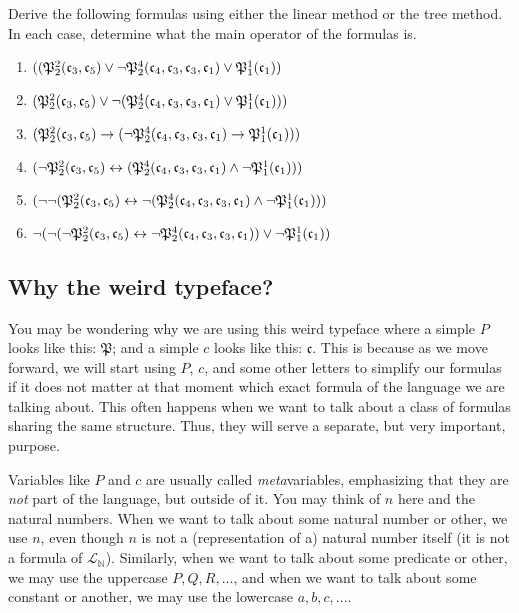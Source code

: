\begin{exc}
Derive the following formulas using either the linear method or the tree method. In each case, determine what the main operator of the formulas is. 

\begin{enumerate}
	\item $((\mathfrak{P}^{2}_{2}(\mathfrak{c}_{3}, \mathfrak{c}_{5})\vee \neg\mathfrak{P}^{4}_{2}(\mathfrak{c}_{4}, \mathfrak{c}_{3}, \mathfrak{c}_{3}, \mathfrak{c}_{1}) \vee \mathfrak{P}^{1}_{1}(\mathfrak{c}_{1}))$
	\item $(\mathfrak{P}^{2}_{2}(\mathfrak{c}_{3}, \mathfrak{c}_{5})\vee \neg(\mathfrak{P}^{4}_{2}(\mathfrak{c}_{4}, \mathfrak{c}_{3}, \mathfrak{c}_{3}, \mathfrak{c}_{1}) \vee \mathfrak{P}^{1}_{1}(\mathfrak{c}_{1})))$
	\item $(\mathfrak{P}^{2}_{2}(\mathfrak{c}_{3}, \mathfrak{c}_{5})\rightarrow (\neg\mathfrak{P}^{4}_{2}(\mathfrak{c}_{4}, \mathfrak{c}_{3}, \mathfrak{c}_{3}, \mathfrak{c}_{1}) \rightarrow \mathfrak{P}^{1}_{1}(\mathfrak{c}_{1})))$
	\item $(\neg\mathfrak{P}^{2}_{2}(\mathfrak{c}_{3}, \mathfrak{c}_{5})\leftrightarrow (\mathfrak{P}^{4}_{2}(\mathfrak{c}_{4}, \mathfrak{c}_{3}, \mathfrak{c}_{3}, \mathfrak{c}_{1}) \wedge \neg \mathfrak{P}^{1}_{1}(\mathfrak{c}_{1})))$
	\item $(\neg\neg(\mathfrak{P}^{2}_{2}(\mathfrak{c}_{3}, \mathfrak{c}_{5})\leftrightarrow \neg (\mathfrak{P}^{4}_{2}(\mathfrak{c}_{4}, \mathfrak{c}_{3}, \mathfrak{c}_{3}, \mathfrak{c}_{1}) \wedge \neg \mathfrak{P}^{1}_{1}(\mathfrak{c}_{1})))$
	\item $\neg(\neg(\neg\mathfrak{P}^{2}_{2}(\mathfrak{c}_{3}, \mathfrak{c}_{5})\leftrightarrow \neg\mathfrak{P}^{4}_{2}(\mathfrak{c}_{4}, \mathfrak{c}_{3}, \mathfrak{c}_{3}, \mathfrak{c}_{1})) \vee \neg \mathfrak{P}^{1}_{1}(\mathfrak{c}_{1}))$
\end{enumerate}
\end{exc}

\subsection{Why the weird typeface?}

You may be wondering why we are using this weird typeface where a simple $P$ looks like this: $\mathfrak{P}$; and a simple $c$ looks like this: $\mathfrak{c}$. This is because as we move forward, we will start using $P$, $c$, and some other letters to simplify our formulas if it does not matter at that moment which exact formula of the language we are talking about. This often happens when we want to talk about a class of formulas sharing the same structure. Thus, they will serve a separate, but very important, purpose. 

Variables like $P$ and $c$ are usually called \textit{meta}variables, emphasizing that they are \textit{not} part of the language, but outside of it. You may think of $n$ here and the natural numbers. When we want to talk about some natural number or other, we use $n$, even though $n$ is not a (representation of a) natural number itself (it is not a formula of $\mathcal{L}_\mathbb{N}$). Similarly, when we want to talk about some predicate or other, we may use the uppercase $P, Q, R, ...$, and when we want to talk about some constant or another, we may use the lowercase $a, b, c, ...$. 

